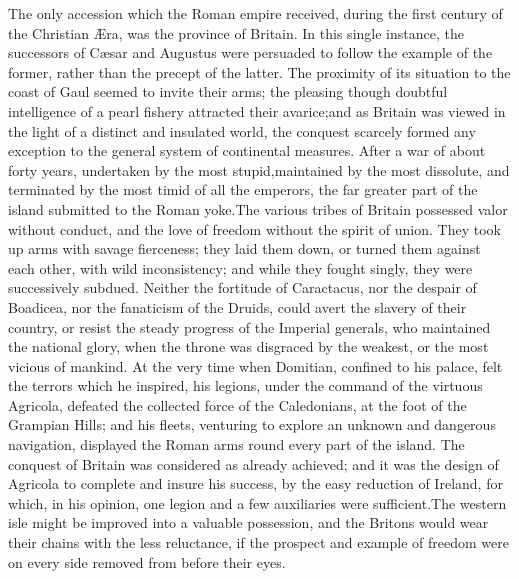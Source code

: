 The only accession which the Roman empire received, during the
first century of the Christian Æra, was the province of Britain.
In this single instance, the successors of Cæsar and Augustus
were persuaded to follow the example of the former, rather than
the precept of the latter. The proximity of its situation to the
coast of Gaul seemed to invite their arms; the pleasing though
doubtful intelligence of a pearl fishery attracted their avarice;\footnotemark[6]
and as Britain was viewed in the light of a distinct and
insulated world, the conquest scarcely formed any exception to
the general system of continental measures. After a war of about
forty years, undertaken by the most stupid,\footnotemark[7] maintained by the
most dissolute, and terminated by the most timid of all the
emperors, the far greater part of the island submitted to the
Roman yoke.\footnotemark[8] The various tribes of Britain possessed valor
without conduct, and the love of freedom without the spirit of
union. They took up arms with savage fierceness; they laid them
down, or turned them against each other, with wild inconsistency;
and while they fought singly, they were successively subdued.
Neither the fortitude of Caractacus, nor the despair of Boadicea,
nor the fanaticism of the Druids, could avert the slavery of
their country, or resist the steady progress of the Imperial
generals, who maintained the national glory, when the throne was
disgraced by the weakest, or the most vicious of mankind. At the
very time when Domitian, confined to his palace, felt the terrors
which he inspired, his legions, under the command of the virtuous
Agricola, defeated the collected force of the Caledonians, at the
foot of the Grampian Hills; and his fleets, venturing to explore
an unknown and dangerous navigation, displayed the Roman arms
round every part of the island. The conquest of Britain was
considered as already achieved; and it was the design of Agricola
to complete and insure his success, by the easy reduction of
Ireland, for which, in his opinion, one legion and a few
auxiliaries were sufficient.\footnotemark[9] The western isle might be improved
into a valuable possession, and the Britons would wear their
chains with the less reluctance, if the prospect and example of
freedom were on every side removed from before their eyes.


